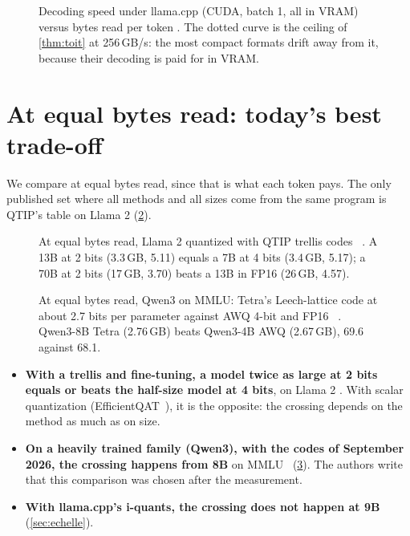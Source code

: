 \begin{figure}[ht]
\centering
\GrapheVitesseQuant
\caption[Decoding speed versus bytes read per token]{Decoding speed under llama.cpp (CUDA, batch 1, all in VRAM) versus bytes read per token \mes. The dotted curve is the ceiling of \cref{thm:toit} at 256\,GB/s: the most compact formats drift away from it, because their decoding is paid for in VRAM.}
\label{fig:vitesse-quant}
\end{figure}

\section{At equal bytes read: today's best trade-off}\label{sec:iso-octets}

We compare at equal bytes read, since that is what each token pays. The only published set where all methods and all sizes come from the same program is QTIP's table on Llama 2 (\cref{fig:iso-octets}).

\begin{figure}[ht]
\centering
\GrapheIsoOctets
\caption[At equal bytes: Llama 2 in trellis codes]{At equal bytes read, Llama 2 quantized with QTIP trellis codes \litt~\calc. A 13B at 2 bits (3.3\,GB, 5.11) equals a 7B at 4 bits (3.4\,GB, 5.17); a 70B at 2 bits (17\,GB, 3.70) beats a 13B in FP16 (26\,GB, 4.57).}
\label{fig:iso-octets}
\end{figure}

\begin{figure}[ht]
\centering
\GrapheMMLU
\caption[At equal bytes: Qwen3 on MMLU]{At equal bytes read, Qwen3 on MMLU: Tetra's Leech-lattice code at about 2.7 bits per parameter against AWQ 4-bit and FP16 \litt~\calc. Qwen3-8B Tetra (2.76\,GB) beats Qwen3-4B AWQ (2.67\,GB), 69.6 against 68.1.}
\label{fig:mmlu}
\end{figure}

\begin{itemize}
\item \textbf{With a trellis and fine-tuning, a model twice as large at 2 bits equals or beats the half-size model at 4 bits}, on Llama 2 \litt. With scalar quantization (EfficientQAT~\cite{efficientqat2024}), it is the opposite: the crossing depends on the method as much as on size.
\item \textbf{On a heavily trained family (Qwen3), with the codes of September 2026, the crossing happens from 8B} on MMLU~\cite{tetra2026} (\cref{fig:mmlu}). The authors write that this comparison was chosen after the measurement.
\item \textbf{With llama.cpp's i-quants, the crossing does not happen at 9B} (\cref{sec:echelle}).
\end{itemize}

